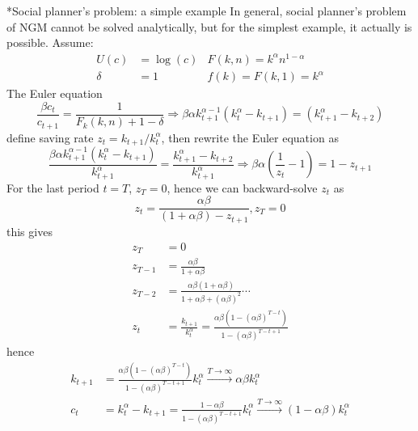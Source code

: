 \documentclass[10pt,landscape,a4paper]{article}
\makeatletter
\renewcommand{\subsection}{\@startsection{subsection}{1}{0mm}{.2ex}{.2ex}{\small\bfseries}}
\makeatother
\begin{document}
\begin{multicols*}{3}

\subsection*{Social planner's problem: a simple example}
In general, social planner's problem of NGM cannot be solved analytically, but for the simplest example, it actually is possible. Assume:
\begin{align*}
    U(c)&=\log(c) & F(k,n) = k^{\alpha}n^{1-\alpha}\\
    \delta &= 1 & f(k)=F(k,1)=k^{\alpha}
\end{align*}
The Euler equation
$$
\frac{\beta c_t}{c_{t+1}}=\frac{1}{F_k(k,n)+1-\delta}\Rightarrow \beta \alpha k_{t+1}^{\alpha-1} (k^{\alpha}_t-k_{t+1}) = (k^{\alpha}_{t+1}-k_{t+2})
$$
define saving rate $z_t = k_{t+1}/k^{\alpha}_t$, then rewrite the Euler equation as 
$$
\frac{\beta \alpha k_{t+1}^{\alpha-1} (k^{\alpha}_t-k_{t+1})}{k_{t+1}^{\alpha}} =\frac{k^{\alpha}_{t+1}-k_{t+2}}{k_{t+1}^{\alpha}}\Rightarrow \beta\alpha\left(\frac{1}{z_t}-1\right)=1-z_{t+1}
$$
For the last period $t=T$, $z_T=0$, hence we can backward-solve $z_t$ as
$$
z_t = \frac{\alpha\beta}{(1+\alpha\beta)-z_{t+1}}, z_T=0
$$
this gives
\begin{align*}
    z_T&=0\\
    z_{T-1}&=\frac{\alpha\beta}{1+\alpha\beta}\\
    z_{T-2} &=\frac{\alpha\beta(1+\alpha\beta)}{1+\alpha\beta+(\alpha\beta)^2}\cdots\\
    z_t &= \frac{k_{t+1}}{k^{\alpha}_t}=\frac{\alpha\beta\left(1-(\alpha\beta)^{T-t}\right)}{1-(\alpha\beta)^{T-t+1}}
\end{align*}
hence
\begin{align*}
    k_{t+1}&=\frac{\alpha\beta\left(1-(\alpha\beta)^{T-t}\right)}{1-(\alpha\beta)^{T-t+1}}k_t^{\alpha}\xrightarrow{T\rightarrow\infty}\alpha\beta k^{\alpha}_t\\
    c_t &= k_t^{\alpha}-k_{t+1} = \frac{1-\alpha\beta}{1-(\alpha\beta)^{T-t+1}}k_t^{\alpha}\xrightarrow{T\rightarrow\infty} (1-\alpha\beta)k^{\alpha}_t
\end{align*}


\end{multicols*}
\end{document}
